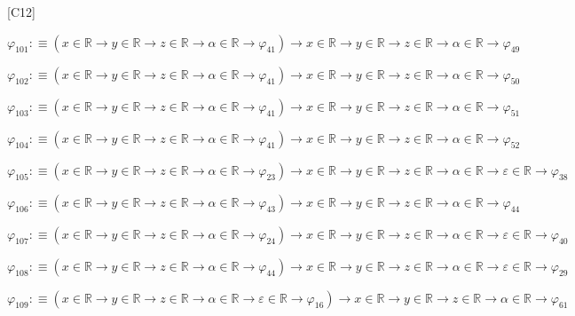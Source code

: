 \begin{fullproof}{[C12]}
\begin{abbrevlist}
\item $\varphi_{101} :\equiv (x \in \mathbb{R} \to y \in \mathbb{R} \to z \in \mathbb{R} \to \alpha \in \mathbb{R} \to \varphi_{41}) \to x \in \mathbb{R} \to y \in \mathbb{R} \to z \in \mathbb{R} \to \alpha \in \mathbb{R} \to \varphi_{49}$
\item $\varphi_{102} :\equiv (x \in \mathbb{R} \to y \in \mathbb{R} \to z \in \mathbb{R} \to \alpha \in \mathbb{R} \to \varphi_{41}) \to x \in \mathbb{R} \to y \in \mathbb{R} \to z \in \mathbb{R} \to \alpha \in \mathbb{R} \to \varphi_{50}$
\item $\varphi_{103} :\equiv (x \in \mathbb{R} \to y \in \mathbb{R} \to z \in \mathbb{R} \to \alpha \in \mathbb{R} \to \varphi_{41}) \to x \in \mathbb{R} \to y \in \mathbb{R} \to z \in \mathbb{R} \to \alpha \in \mathbb{R} \to \varphi_{51}$
\item $\varphi_{104} :\equiv (x \in \mathbb{R} \to y \in \mathbb{R} \to z \in \mathbb{R} \to \alpha \in \mathbb{R} \to \varphi_{41}) \to x \in \mathbb{R} \to y \in \mathbb{R} \to z \in \mathbb{R} \to \alpha \in \mathbb{R} \to \varphi_{52}$
\item $\varphi_{105} :\equiv (x \in \mathbb{R} \to y \in \mathbb{R} \to z \in \mathbb{R} \to \alpha \in \mathbb{R} \to \varphi_{23}) \to x \in \mathbb{R} \to y \in \mathbb{R} \to z \in \mathbb{R} \to \alpha \in \mathbb{R} \to \varepsilon \in \mathbb{R} \to \varphi_{38}$
\item $\varphi_{106} :\equiv (x \in \mathbb{R} \to y \in \mathbb{R} \to z \in \mathbb{R} \to \alpha \in \mathbb{R} \to \varphi_{43}) \to x \in \mathbb{R} \to y \in \mathbb{R} \to z \in \mathbb{R} \to \alpha \in \mathbb{R} \to \varphi_{44}$
\item $\varphi_{107} :\equiv (x \in \mathbb{R} \to y \in \mathbb{R} \to z \in \mathbb{R} \to \alpha \in \mathbb{R} \to \varphi_{24}) \to x \in \mathbb{R} \to y \in \mathbb{R} \to z \in \mathbb{R} \to \alpha \in \mathbb{R} \to \varepsilon \in \mathbb{R} \to \varphi_{40}$
\item $\varphi_{108} :\equiv (x \in \mathbb{R} \to y \in \mathbb{R} \to z \in \mathbb{R} \to \alpha \in \mathbb{R} \to \varphi_{44}) \to x \in \mathbb{R} \to y \in \mathbb{R} \to z \in \mathbb{R} \to \alpha \in \mathbb{R} \to \varepsilon \in \mathbb{R} \to \varphi_{29}$
\item $\varphi_{109} :\equiv (x \in \mathbb{R} \to y \in \mathbb{R} \to z \in \mathbb{R} \to \alpha \in \mathbb{R} \to \varepsilon \in \mathbb{R} \to \varphi_{16}) \to x \in \mathbb{R} \to y \in \mathbb{R} \to z \in \mathbb{R} \to \alpha \in \mathbb{R} \to \varphi_{61}$

\end{abbrevlist}
\end{fullproof}
